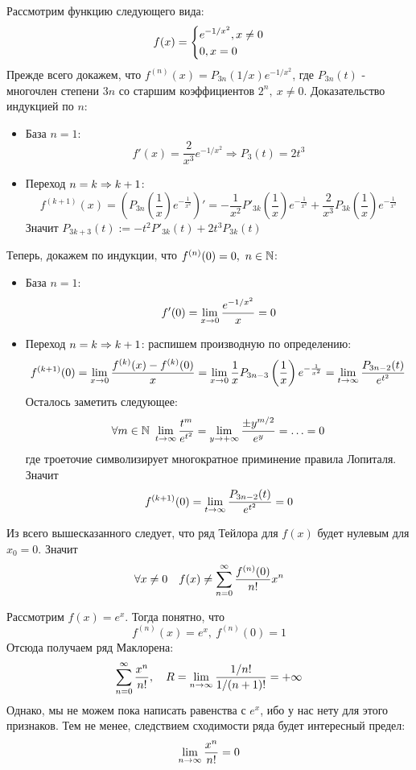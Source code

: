 \begin{example}
	Рассмотрим функцию следующего вида:
	\[
		f(x) = \left\{\begin{aligned}
			&{e^{-1/x^2}, x \neq 0}
			\\
			&{0, x = 0}
		\end{aligned}\right.
	\]
	Прежде всего докажем, что $f^{(n)}(x) = P_{3n}(1/x)e^{-1/x^2}$, где $P_{3n}(t)$ - многочлен степени $3n$ со старшим коэффициентов $2^n,\ x \neq 0$. Доказательство индукцией по $n$:
	\begin{itemize}
		\item База $n = 1$:
		\[
			f'(x) = \frac{2}{x^3} e^{-1/x^2} \Longrightarrow P_3(t) = 2t^3
		\]
		
		\item Переход $n = k \Rightarrow k + 1$:
		\[
			f^{(k + 1)}(x) = \left(P_{3n}\left(\frac{1}{x}\right)e^{-\frac{1}{x^2}}\right)' = -\frac{1}{x^2} P'_{3k}\left(\frac{1}{x}\right)e^{-\frac{1}{x^2}} + \frac{2}{x^3} P_{3k}\left(\frac{1}{x}\right)e^{-\frac{1}{x^2}}
		\]
		Значит $P_{3k + 3}(t) := -t^2 P'_{3k}(t) + 2t^3 P_{3k}(t)$
	\end{itemize}
	Теперь, докажем по индукции, что $f^{(n)}(0) = 0,\ n \in \mathbb{N}$:
	\begin{itemize}
		\item База $n = 1$:
		\[
			f'(0) = \lim\limits_{x \to 0} \frac{e^{-1/x^2}}{x} = 0
		\]
		
		\item Переход $n = k \Rightarrow k + 1$: распишем производную по определению:
		\[
			f^{(k + 1)}(0) = \lim\limits_{x \to 0} \frac{f^{(k)}(x) - f^{(k)}(0)}{x} = \lim\limits_{x \to 0} \frac{1}{x}P_{3n - 3}\left(\frac{1}{x}\right)e^{-\frac{1}{x^2}} = \lim\limits_{t \to \infty} \frac{P_{3n - 2}(t)}{e^{t^2}}
		\]
		Осталось заметить следующее:
		\[
			\forall m \in \N\ \liml_{t \to \infty} \frac{t^m}{e^{t^2}} = \liml_{y \to +\infty} \frac{\pm y^{m/2}}{e^y} = \ldots = 0
		\]
		где троеточие символизирует многократное приминение правила Лопиталя. Значит
		\[
			f^{(k + 1)}(0) = \lim\limits_{t \to \infty} \frac{P_{3n - 2}(t)}{e^{t^2}} = 0
		\]
	\end{itemize}
	Из всего вышесказанного следует, что ряд Тейлора для $f(x)$ будет нулевым для $x_0 = 0$. Значит
	\[
		\forall x \neq 0 \quad f(x) \neq \sum_{n = 0}^\infty \frac{f^{(n)}(0)}{n!}x^n
	\]
\end{example}

\begin{example}
	Рассмотрим $f(x) = e^x$. Тогда понятно, что
	\[
		f^{(n)}(x) = e^x,\ f^{(n)}(0) = 1
	\]
	Отсюда получаем ряд Маклорена:
	\[
		\sum_{n = 0}^\infty \frac{x^n}{n!}, \quad R = \lim\limits_{n \to \infty} \frac{1/n!}{1/(n + 1)!} = +\infty
	\]
	Однако, мы не можем пока написать равенства с $e^x$, ибо у нас нету для этого признаков. Тем не менее, следствием сходимости ряда будет интересный предел:
	\[
		\lim\limits_{n \to \infty} \frac{x^n}{n!} = 0
	\]
\end{example}


